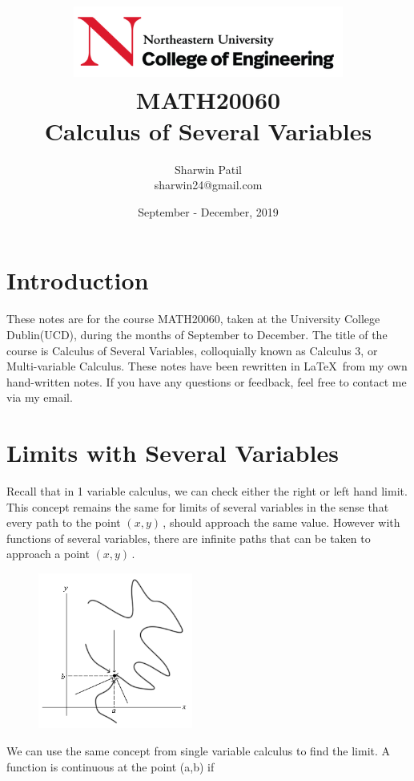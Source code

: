 \documentclass{article}
\newcommand{\n}{\leavevmode \newline} %
\newcommand{\xy}{$(x,y)\,$} %
\numberwithin{equation}{subsection} %
\begin{document}
\title{
\includegraphics[width=3.5in]{logo}\\
MATH20060\\
Calculus of Several Variables}
\author{Sharwin Patil\\ sharwin24@gmail.com}
\date{September - December, 2019}
\maketitle

\section*{Introduction}
These notes are for the course MATH20060, taken at the University College Dublin(UCD), during the months of September to December. The title of the course is Calculus of Several Variables, colloquially known as Calculus 3, or Multi-variable Calculus. These notes have been rewritten in \LaTeX\, from my own hand-written notes. If you have any questions or feedback, feel free to contact me via my email.

\tableofcontents

\section{Limits with Several Variables}
Recall that in 1 variable calculus, we can check either the right or left hand limit. This concept remains the same for limits of several variables in the sense that every path to the point \xy, should approach the same value. However with functions of several variables, there are infinite paths that can be taken to approach a point \xy.

\begin{figure}[H]
    \centering
    \includegraphics[width=2in]{multiplePaths.png}
\end{figure}
\n
We can use the same concept from single variable calculus to find the limit. A function is continuous at the point (a,b) if
\end{document}

